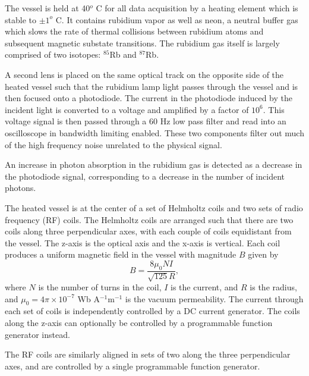 The vessel is held at 40$^{o}$ C for all data acquisition by a heating element which is stable to $\pm1^{o}$ C. It contains rubidium vapor as well as neon, a neutral buffer gas which slows the rate of thermal collisions between rubidium atoms and subsequent magnetic substate transitions. The rubidium gas itself is largely comprised of two isotopes: $^{85}$Rb and $^{87}$Rb. 

A second lens is placed on the same optical track on the opposite side of the heated vessel such that the rubidium lamp light passes through the vessel and is then focused onto a photodiode. The current in the photodiode induced by the incident light is converted to a voltage and amplified by a factor of $10^6$. This voltage signal is then passed through a 60 Hz low pass filter and read into an oscilloscope in bandwidth limiting enabled. These two components filter out much of the high frequency noise unrelated to the physical signal. 

An increase in photon absorption in the rubidium gas is detected as a decrease in the photodiode signal, corresponding to a decrease in the number of incident photons. 

The heated vessel is at the center of a set of Helmholtz coils and two sets of radio frequency (RF) coils. The Helmholtz coils are arranged such that there are two coils along three perpendicular axes, with each couple of coils equidistant from the vessel. The z-axis is the optical axis and the x-axis is vertical. Each coil produces a uniform magnetic field in the vessel with magnitude $B$ given by 
\begin{equation}
B = \frac{8\mu_0 N I}{\sqrt{125}R}, \label{b}
\end{equation}
where $N$ is the number of turns in the coil, $I$ is the current, and $R$ is the radius, and $\mu_0=4\pi \times 10^{-7}$ Wb A$^{-1}$m$^{-1}$ is the vacuum permeability. The current through each set of coils is independently controlled by a DC current generator. The coils along the z-axis can optionally be controlled by a programmable function generator instead. 

The RF coils are similarly aligned in sets of two along the three perpendicular axes, and are controlled by a single programmable function generator. 


